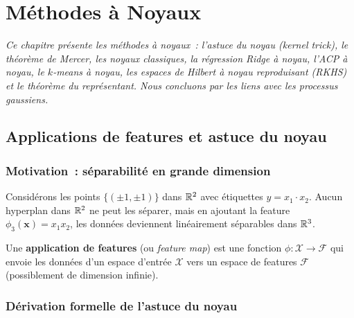 \chapter{M\'ethodes \`a Noyaux}
\label{ch:noyaux}

\noindent\textit{Ce chapitre pr\'esente les m\'ethodes \`a noyaux~: l'astuce
du noyau (\emph{kernel trick}), le th\'eor\`eme de Mercer, les noyaux
classiques, la r\'egression Ridge \`a noyau, l'ACP \`a noyau, le
$k$-means \`a noyau, les espaces de Hilbert \`a noyau reproduisant (RKHS)
et le th\'eor\`eme du repr\'esentant. Nous concluons par les liens avec
les processus gaussiens.}\medskip

\section{Applications de features et astuce du noyau}
\label{sec:kernel-trick}

\subsection{Motivation~: s\'eparabilit\'e en grande dimension}

\begin{exemple}
Consid\'erons les points $\{(\pm 1, \pm 1)\}$ dans $\mathbb{R}^2$ avec \'etiquettes
$y = x_1 \cdot x_2$. Aucun hyperplan dans $\mathbb{R}^2$ ne peut les s\'eparer,
mais en ajoutant la feature $\phi_3(\bm{x}) = x_1 x_2$, les donn\'ees
deviennent lin\'eairement s\'eparables dans $\mathbb{R}^3$.
\end{exemple}

\begin{definition}
\label{def:feature-map}
Une \textbf{application de features}
(ou \emph{feature map}) est une fonction
$\phi : \mathcal{X} \to \mathcal{F}$ qui envoie les donn\'ees d'un
espace d'entr\'ee $\mathcal{X}$ vers un espace de features $\mathcal{F}$
(possiblement de dimension infinie).
\end{definition}

\subsection{D\'erivation formelle de l'astuce du noyau}

